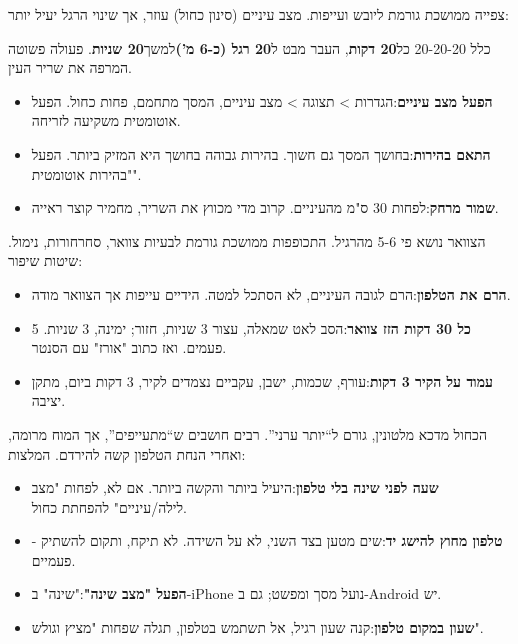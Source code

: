 
צפייה ממושכת גורמת ליובש ועייפות. מצב עיניים (סינון כחול) עוזר, אך שינוי הרגל יעיל יותר:

\begin{tcbinfo}{כלל 20-20-20}
כל\textbf{20 דקות}, העבר מבט ל\textbf{20 רגל (כ-6 מ')}למשך\textbf{20 שניות}. פעולה פשוטה המרפה את שריר העין.

\end{tcbinfo}

\begin{itemize}
  \item \textbf{הפעל מצב עיניים}:הגדרות > תצוגה > מצב עיניים, המסך מתחמם, פחות כחול. הפעל אוטומטית משקיעה לזריחה.
  \item \textbf{התאם בהירות}:בחושך המסך גם חשוך. בהירות גבוהה בחושך היא המזיק ביותר. הפעל "בהירות אוטומטית".
  \item \textbf{שמור מרחק}:לפחות 30 ס"מ מהעיניים. קרוב מדי מכווץ את השריר, מחמיר קוצר ראייה.
\end{itemize}


הצוואר נושא פי 5-6 מהרגיל. התכופפות ממושכת גורמת לבעיות צוואר, סחרחורות, נימול. שיטות שיפור:

\begin{itemize}
  \item \textbf{הרם את הטלפון}:הרם לגובה העיניים, לא הסתכל למטה. הידיים עייפות אך הצוואר מודה.
  \item \textbf{כל 30 דקות הזז צוואר}:הסב לאט שמאלה, עצור 3 שניות, חזור; ימינה, 3 שניות. 5 פעמים. ואז כתוב "אורז" עם הסנטר.
  \item \textbf{עמוד על הקיר 3 דקות}:עורף, שכמות, ישבן, עקביים נצמדים לקיר, 3 דקות ביום, מתקן יציבה.
\end{itemize}


הכחול מדכא מלטונין, גורם ל“יותר ערני”. רבים חושבים ש“מתעייפים”, אך המוח מרומה, ואחרי הנחת הטלפון קשה להירדם. המלצות:

\begin{itemize}
  \item \textbf{שעה לפני שינה בלי טלפון}:היעיל ביותר והקשה ביותר. אם לא, לפחות "מצב לילה/עיניים" להפחתת כחול.
  \item \textbf{טלפון מחוץ להישג יד}:שים מטען בצד השני, לא על השידה. לא תיקח, ותקום להשתיק - פעמיים.
  \item \textbf{הפעל "מצב שינה"}:"שינה" ב-iPhone נועל מסך ומפשט; גם ב-Android יש.
  \item \textbf{שעון במקום טלפון}:קנה שעון רגיל, אל תשתמש בטלפון, תגלה שפחות "מציץ וגולש".
\end{itemize}

